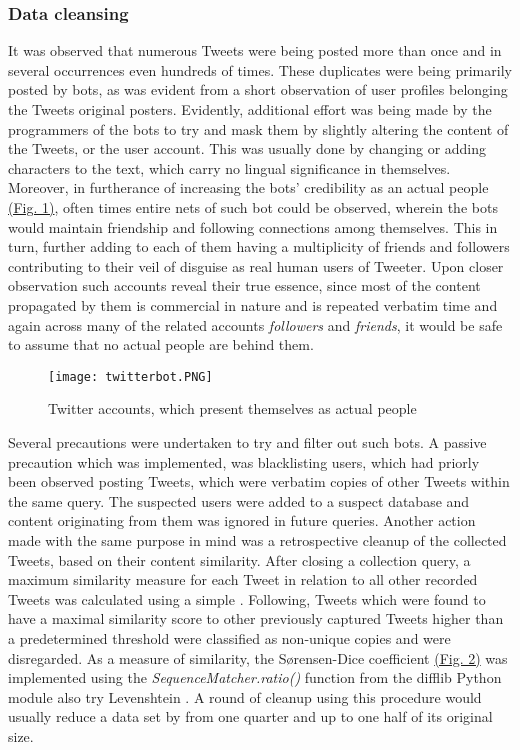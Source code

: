		\subsubsection*{Data cleansing}
		It was observed that numerous Tweets were being posted more than once and in several occurrences even hundreds of times. These duplicates were being primarily posted by bots, as was evident from a short observation of user profiles belonging the Tweets original posters. Evidently, additional effort was being made by the programmers of the bots to try and mask them by slightly altering the content of the Tweets, or the user account. This was usually done by changing or adding characters to the text, which carry no lingual significance in themselves. Moreover, in furtherance of increasing the bots' credibility as an actual people \hyperref[fig:twitterbot]{(Fig. 1)}, often times entire nets of such bot could be observed, wherein the bots would maintain friendship and following connections among themselves. This in turn, further adding to each of them having a multiplicity of friends and followers contributing to their veil of disguise as real human users of Tweeter. Upon closer observation such accounts reveal their true essence, since most of the content propagated by them is commercial in nature and is repeated verbatim time and again across many of the related accounts \textit{followers} and \textit{friends}, it would be safe to assume that no actual people are behind them. 
		\par
		
		\begin{figure}[h]
			\centering
			\label{fig:twitterbot}
			\texttt{[image: twitterbot.PNG]}
			\captionsetup{width=0.8\textwidth}
			\caption[Fake Twitter Accounts]{Twitter accounts, which present themselves as actual people}
		\end{figure}
		
		\newpage
		\noindent
		Several precautions were undertaken to try and filter out such bots. A passive precaution which was implemented, was blacklisting users, which had priorly been observed posting Tweets, which were verbatim copies of other Tweets within the same query. The suspected users were added to a suspect database and content originating from them was ignored in future queries. Another action made with the same purpose in mind was a retrospective cleanup of the collected Tweets, based on their content similarity. After closing a collection query, a maximum similarity measure for each Tweet in relation to all other recorded Tweets was calculated using a simple . Following, Tweets which were found to have a maximal similarity score to other previously captured Tweets  higher than a predetermined threshold were classified as non-unique copies and were disregarded. As a measure of similarity, the S\o rensen-Dice coefficient\cite{sorensen1948method} \hyperref[fig:sorenson_dice]{(Fig. 2)} was implemented using the \textit{SequenceMatcher.ratio()} function from the difflib Python module {\color{red} \Large also try Levenshtein }. A round of cleanup using this procedure would usually reduce a data set by from one quarter and up to one half of its original size.
		
